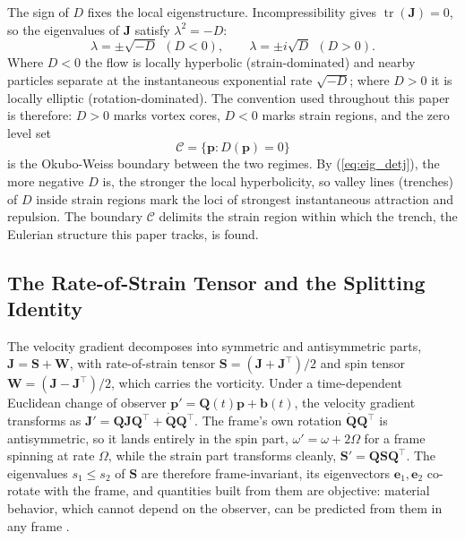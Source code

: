 \documentclass[lettersize,journal]{IEEEtran}
\begin{document}
The sign of $D$ fixes the local eigenstructure. Incompressibility gives
$\operatorname{tr}(\mathbf{J}) = 0$, so the eigenvalues of $\mathbf{J}$
satisfy $\lambda^2 = -D$:
\begin{equation}
    \lambda = \pm\sqrt{-D} \ \ (D < 0), \qquad
    \lambda = \pm i\sqrt{D} \ \ (D > 0).
    \label{eq:eig_detj}
\end{equation}
Where $D < 0$ the flow is locally hyperbolic (strain-dominated) and
nearby particles separate at the instantaneous exponential rate
$\sqrt{-D}$; where $D > 0$ it is locally elliptic (rotation-dominated).
The convention used throughout this paper is therefore: $D > 0$ marks
vortex cores, $D < 0$ marks strain regions, and the zero level set
\begin{equation}
    \mathcal{C} = \{\mathbf{p} : D(\mathbf{p}) = 0\}
    \label{eq:ow_boundary}
\end{equation}
is the Okubo-Weiss boundary between the two regimes. By
(\ref{eq:eig_detj}), the more negative $D$ is, the stronger the local
hyperbolicity, so valley lines (trenches) of $D$ inside strain regions
mark the loci of strongest instantaneous attraction and repulsion. The
boundary $\mathcal{C}$ delimits the strain region within which the
trench, the Eulerian structure this paper tracks, is found.

\subsection{The Rate-of-Strain Tensor and the Splitting Identity}
\label{sec:strain_field}

The velocity gradient decomposes into symmetric and antisymmetric
parts, $\mathbf{J} = \mathbf{S} + \mathbf{W}$, with rate-of-strain
tensor $\mathbf{S} = (\mathbf{J} + \mathbf{J}^\top)/2$ and spin tensor
$\mathbf{W} = (\mathbf{J} - \mathbf{J}^\top)/2$, which carries the
vorticity. Under a time-dependent Euclidean change of observer
$\mathbf{p}' = \mathbf{Q}(t)\mathbf{p} + \mathbf{b}(t)$, the velocity
gradient transforms as $\mathbf{J}' = \mathbf{Q}\mathbf{J}
\mathbf{Q}^\top + \dot{\mathbf{Q}}\mathbf{Q}^\top$. The frame's own
rotation $\dot{\mathbf{Q}}\mathbf{Q}^\top$ is antisymmetric, so it
lands entirely in the spin part, $\omega' = \omega + 2\Omega$ for a
frame spinning at rate $\Omega$, while the strain part transforms
cleanly, $\mathbf{S}' = \mathbf{Q}\mathbf{S}\mathbf{Q}^\top$. The
eigenvalues $s_1 \leq s_2$ of $\mathbf{S}$ are therefore
frame-invariant, its eigenvectors $\mathbf{e}_1, \mathbf{e}_2$
co-rotate with the frame, and quantities built from them are objective:
material behavior, which cannot depend on the observer, can be
predicted from them in any frame \cite{16,17}.
\end{document}
